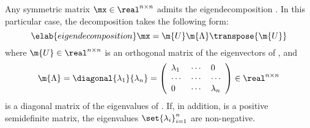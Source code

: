 Any symmetric matrix $\mx \in \real^{n \times n}$ admits the eigendecomposition
\cite{press2007}. In this particular case, the decomposition takes the following
form:
\begin{equation} \elab{eigendecomposition}
  \mx = \m{U} \m{\Lambda} \transpose{\m{U}}
\end{equation}
where $\m{U} \in \real^{n \times n}$ is an orthogonal matrix of the eigenvectors
of \mx, and
\[
  \m{\Lambda} = \diagonal{\lambda_1}{\lambda_n} = \left(
    \begin{array}{lll}
      \lambda_1 & \cdots & 0         \\
      \cdots    & \cdots & \cdots    \\
      0         & \cdots & \lambda_n
    \end{array}
  \right) \in \real^{n \times n}
\]
is a diagonal matrix of the eigenvalues of \mx. If, in addition, \mx is a
positive semidefinite matrix, the eigenvalues $\set{\lambda_i}_{i = 1}^n$ are
non-negative.

